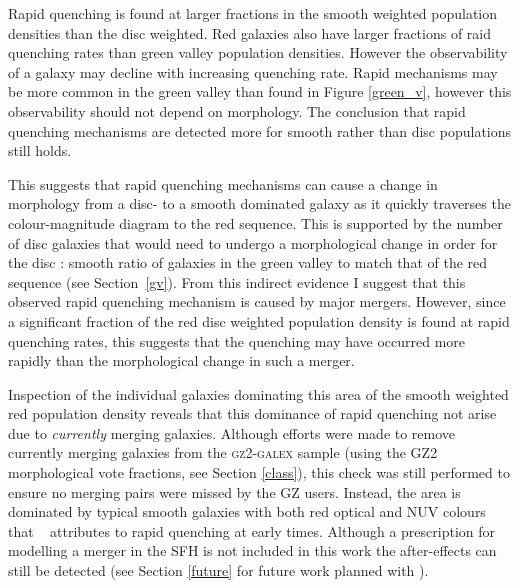 Rapid quenching is found at larger fractions in the smooth weighted population densities than the disc weighted. Red galaxies also have larger fractions of raid quenching rates than green valley population densities. However the observability of a galaxy may decline with increasing quenching rate. Rapid mechanisms may be more common in the green valley than found in Figure \ref{green_v}, however this observability should not depend on morphology. The conclusion that rapid quenching mechanisms are detected more for smooth rather than disc populations still holds. 

This suggests that rapid quenching mechanisms can cause a change in morphology from a disc- to a smooth dominated galaxy as it quickly traverses the colour-magnitude diagram to the red sequence. This is supported by the number of disc galaxies that would need to undergo a morphological change in order for the disc : smooth ratio of galaxies in the green valley to match that of the red sequence (see Section~\ref{gv}). From this indirect evidence I suggest that this observed rapid quenching mechanism is caused by major mergers. However, since a significant fraction of the red disc weighted population density is found at rapid quenching rates, this suggests that the quenching may have occurred more rapidly than the morphological change in such a merger.

Inspection of the individual galaxies dominating this area of the smooth weighted red population density reveals that this dominance of rapid quenching not arise due to \emph{currently} merging galaxies. Although efforts were made to remove currently merging galaxies from the \textsc{gz2-galex} sample (using the GZ2 morphological vote fractions, see Section \ref{class}), this check was still performed to ensure no merging pairs were missed by the GZ users. Instead, the area is dominated by typical smooth galaxies with both red optical and NUV colours that \starpy~ attributes to rapid quenching at early times. Although a prescription for modelling a merger in the SFH is not included in this work the after-effects can still be detected (see Section \ref{future} for future work planned with \starpy).

